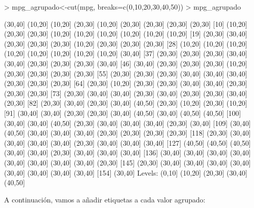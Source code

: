 \documentclass [a4paper] {article}
\begin{document}
\begin{Schunk}
\begin{Sinput}
> mpg_agrupado<-cut(mpg, breaks=c(0,10,20,30,40,50))
> mpg_agrupado
\end{Sinput}
\begin{Soutput}
  [1] (30,40] (10,20] (10,20] (20,30] (10,20] (20,30] (20,30] (20,30] (20,30]
 [10] (10,20] (20,30] (20,30] (10,20] (10,20] (10,20] (10,20] (10,20] (10,20]
 [19] (20,30] (30,40] (20,30] (20,30] (20,30] (10,20] (20,30] (20,30] (20,30]
 [28] (10,20] (10,20] (10,20] (10,20] (10,20] (10,20] (10,20] (10,20] (30,40]
 [37] (20,30] (20,30] (20,30] (30,40] (30,40] (20,30] (20,30] (20,30] (30,40]
 [46] (30,40] (20,30] (20,30] (20,30] (10,20] (20,30] (20,30] (20,30] (20,30]
 [55] (20,30] (20,30] (20,30] (30,40] (30,40] (30,40] (20,30] (20,30] (20,30]
 [64] (20,30] (10,20] (20,30] (20,30] (30,40] (30,40] (20,30] (20,30] (20,30]
 [73] (20,30] (30,40] (30,40] (20,30] (30,40] (20,30] (20,30] (30,40] (20,30]
 [82] (20,30] (30,40] (20,30] (30,40] (40,50] (20,30] (10,20] (20,30] (10,20]
 [91] (30,40] (30,40] (20,30] (20,30] (30,40] (40,50] (30,40] (40,50] (40,50]
[100] (30,40] (30,40] (40,50] (20,30] (30,40] (30,40] (30,40] (20,30] (30,40]
[109] (30,40] (40,50] (30,40] (30,40] (30,40] (20,30] (20,30] (20,30] (20,30]
[118] (20,30] (30,40] (30,40] (30,40] (30,40] (20,30] (30,40] (30,40] (30,40]
[127] (40,50] (40,50] (40,50] (30,40] (30,40] (20,30] (30,40] (30,40] (30,40]
[136] (30,40] (30,40] (30,40] (30,40] (30,40] (30,40] (30,40] (30,40] (20,30]
[145] (20,30] (30,40] (30,40] (30,40] (30,40] (30,40] (30,40] (30,40] (30,40]
[154] (30,40]
Levels: (0,10] (10,20] (20,30] (30,40] (40,50]
\end{Soutput}
\end{Schunk}
A continuación, vamos a añadir etiquetas a cada valor agrupado:
\end{document}
